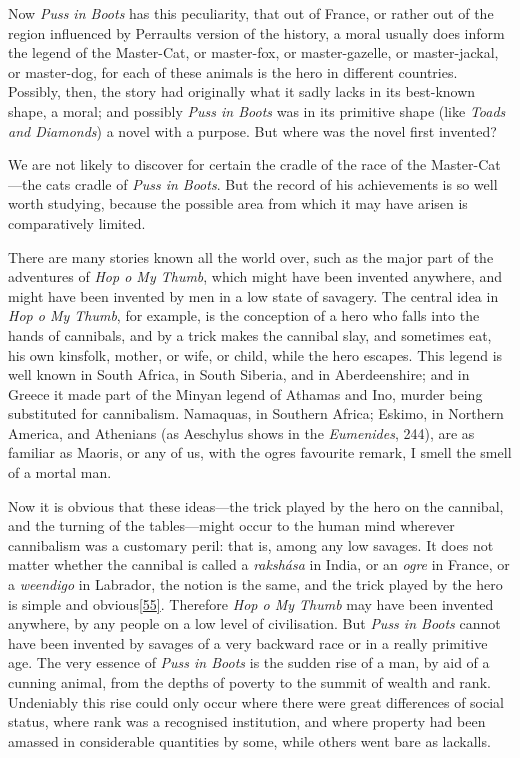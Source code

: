 \documentclass[14pt,a4paper]{memoir}
\begin{document}
Now \emph{Puss in Boots} has this peculiarity, that out of France, or
rather out of the region influenced by Perrault\textquotesingle s
version of the history, a moral usually does inform the legend of the
Master-Cat, or master-fox, or master-gazelle, or master-jackal, or
master-dog, for each of these animals is the hero in different
countries. Possibly, then, the story had originally what it sadly lacks
in its best-known shape, a moral; and possibly \emph{Puss in Boots} was
in its primitive shape (like \emph{Toads and Diamonds}) a novel with a
purpose. But where was the novel first invented?

We are not likely to discover for certain the cradle of the race of the
Master-Cat---the \textquotesingle cat\textquotesingle s
cradle\textquotesingle{} of \emph{Puss in Boots}. But the record of his
achievements is so well worth studying, because the possible area from
which it may have arisen is comparatively limited.

There are many stories known all the world over, such as the major part
of the adventures of \emph{Hop o\textquotesingle{} My Thumb}, which
might have been invented anywhere, and might have been invented by men
in a low state of savagery. The central idea in \emph{Hop
o\textquotesingle{} My Thumb}, for example, is the conception of a hero
who falls into the hands of cannibals, and by a trick makes the cannibal
slay, and sometimes eat, his own kinsfolk, mother, or wife, or child,
while the hero escapes. This legend is well known in South Africa, in
South Siberia, and in Aberdeenshire; and in Greece it made part of the
Minyan legend of Athamas and Ino, murder being substituted for
cannibalism. Namaquas, in Southern Africa; Eskimo, in Northern America,
and Athenians (as Aeschylus shows in the \emph{Eumenides}, 244), are as
familiar as Maoris, or any of us, with the ogre\textquotesingle s
favourite remark, \textquotesingle I smell the smell of a mortal
man.\textquotesingle{}

Now it is obvious that these ideas---the trick played by the hero on the
cannibal, and the turning of the tables---might occur to the human mind
wherever cannibalism was a customary peril: that is, among any low
savages. It does not matter whether the cannibal is called a
\emph{rakshása} in India, or an \emph{ogre} in France, or a
\emph{weendigo} in Labrador, the notion is the same, and the trick
played by the hero is simple and
obvious\protect\hypertarget{4533318093929944247_33931-h-0.htm.xhtmlux5cux23FNanchor_55}{}{}\protect\hyperlink{4533318093929944247_33931-h-1.htm.xhtmlux5cux23Footnote_55}{{[}55{]}}.
Therefore \emph{Hop o\textquotesingle{} My Thumb} may have been invented
anywhere, by any people on a low level of civilisation. But \emph{Puss
in Boots} cannot have been invented by savages of a very backward race
or in a really \textquotesingle primitive\textquotesingle{} age. The
very essence of \emph{Puss in Boots} is the sudden rise of a man, by aid
of a cunning animal, from the depths of poverty to the summit of wealth
and rank. Undeniably this rise could only occur where there were great
differences of social status, where rank was a recognised institution,
and where property had been amassed in considerable quantities by some,
while others went bare as lackalls.
\end{document}
